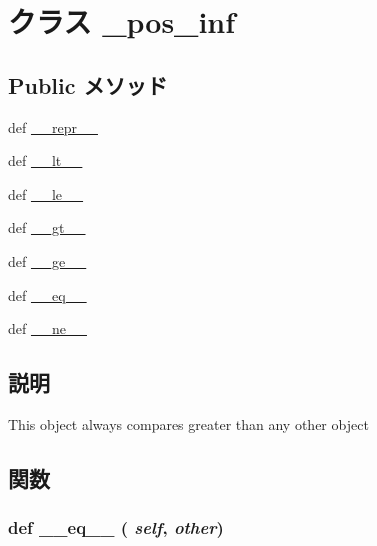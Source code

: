 \hypertarget{classm5_1_1util_1_1region_1_1__pos__inf}{
\section{クラス \_\-pos\_\-inf}
\label{classm5_1_1util_1_1region_1_1__pos__inf}
}
\subsection*{Public メソッド}
\begin{DoxyCompactItemize}
\item 
def \hyperlink{classm5_1_1util_1_1region_1_1__pos__inf_ad8b9328939df072e4740cd9a63189744}{\_\-\_\-repr\_\-\_\-}
\item 
def \hyperlink{classm5_1_1util_1_1region_1_1__pos__inf_a6a45920abc8ecf2d458d174ea7304f8a}{\_\-\_\-lt\_\-\_\-}
\item 
def \hyperlink{classm5_1_1util_1_1region_1_1__pos__inf_a83166e4aabc2805e71aef3a43f016181}{\_\-\_\-le\_\-\_\-}
\item 
def \hyperlink{classm5_1_1util_1_1region_1_1__pos__inf_a728aec3eafa75fd847ce0bf8f954efde}{\_\-\_\-gt\_\-\_\-}
\item 
def \hyperlink{classm5_1_1util_1_1region_1_1__pos__inf_a3ee81c22a31860655ba6bf83ff5a8f36}{\_\-\_\-ge\_\-\_\-}
\item 
def \hyperlink{classm5_1_1util_1_1region_1_1__pos__inf_a449f8fd74d358c0ad641b6c6d6917ba0}{\_\-\_\-eq\_\-\_\-}
\item 
def \hyperlink{classm5_1_1util_1_1region_1_1__pos__inf_ad69df72a6bf0be3525fe45cd2f77f343}{\_\-\_\-ne\_\-\_\-}
\end{DoxyCompactItemize}


\subsection{説明}
\begin{DoxyVerb}This object always compares greater than any other object\end{DoxyVerb}
 

\subsection{関数}
\hypertarget{classm5_1_1util_1_1region_1_1__pos__inf_a449f8fd74d358c0ad641b6c6d6917ba0}{
\subsubsection[{\_\-\_\-eq\_\-\_\-}]{\setlength{\rightskip}{0pt plus 5cm}def \_\-\_\-eq\_\-\_\- ( {\em self}, \/   {\em other})}}
\label{classm5_1_1util_1_1region_1_1__pos__inf_a449f8fd74d358c0ad641b6c6d6917ba0}




